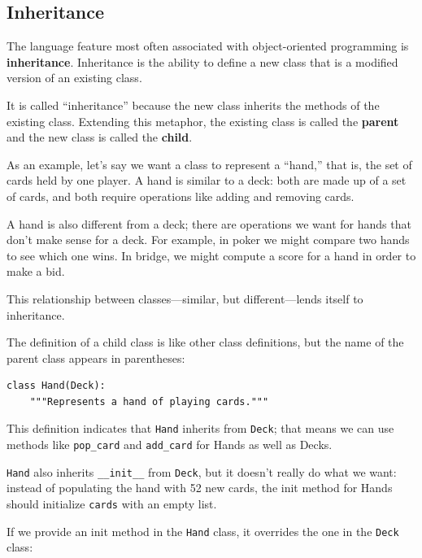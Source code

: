 \documentclass[10pt]{book}
\begin{document}
\begin{CJK}{UTF8}{gbsn}
\section{Inheritance}

The language feature most often associated with object-oriented
programming is {\bf inheritance}.  Inheritance is the ability to
define a new class that is a modified version of an existing
class.

It is called ``inheritance'' because the new class inherits the
methods of the existing class.  Extending this metaphor, the existing
class is called the {\bf parent} and the new class is
called the {\bf child}.

As an example, let's say we want a class to represent a ``hand,''
that is, the set of cards held by one player.  A hand is similar to a
deck: both are made up of a set of cards, and both require operations
like adding and removing cards.

A hand is also different from a deck; there are operations we want for
hands that don't make sense for a deck.  For example, in poker we
might compare two hands to see which one wins.  In bridge, we might
compute a score for a hand in order to make a bid.

This relationship between classes---similar, but different---lends
itself to inheritance.  

The definition of a child class is like other class definitions,
but the name of the parent class appears in parentheses:

\begin{verbatim}
class Hand(Deck):
    """Represents a hand of playing cards."""
\end{verbatim}
%
This definition indicates that {\tt Hand} inherits from {\tt Deck};
that means we can use methods like \verb"pop_card" and \verb"add_card"
for Hands as well as Decks.

{\tt Hand} also inherits \verb"__init__" from {\tt Deck}, but
it doesn't really do what we want: instead of populating the hand
with 52 new cards, the init method for Hands should initialize
{\tt cards} with an empty list.

If we provide an init method in the {\tt Hand} class, it overrides the
one in the {\tt Deck} class:


\end{CJK}
\end{document}
